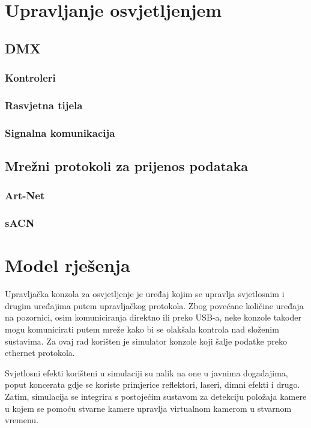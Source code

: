 \documentclass[times, utf8, zavrsni, numeric]{fer}
\begin{document}
\chapter{Upravljanje osvjetljenjem}

\section{DMX}

\subsection{Kontroleri}

\subsection{Rasvjetna tijela}

\subsection{Signalna komunikacija}

\section{Mrežni protokoli za prijenos podataka}

\subsection{Art-Net}

\subsection{sACN}

\chapter{Model rješenja}
Upravljačka konzola za osvjetljenje je uređaj kojim se upravlja svjetlosnim i drugim uređajima putem upravljačkog protokola. Zbog povećane količine uređaja na pozornici, osim komuniciranja direktno ili preko USB-a, neke konzole također mogu komunicirati putem mreže kako bi se olakšala kontrola nad složenim sustavima. Za ovaj rad korišten je simulator konzole koji šalje podatke preko ethernet protokola.\newline

Svjetlosni efekti korišteni u simulaciji su nalik na one u javnima događajima, poput koncerata gdje se koriste primjerice reflektori, laseri, dimni efekti i drugo.
Zatim, simulacija se integrira s postojećim sustavom za detekciju položaja kamere u kojem se pomoću stvarne kamere upravlja virtualnom kamerom u stvarnom vremenu.
\end{document}
